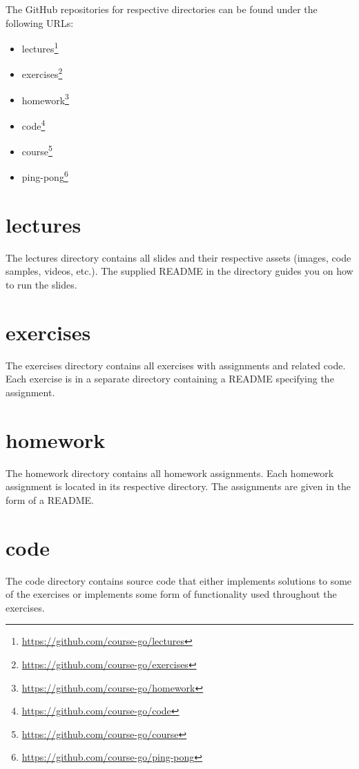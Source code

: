 \documentclass[
  digital,
  color,
  oneside,
  nosansbold,
  nocolorbold,
  lof,
  nolot,
]{fithesis4}
\begin{document}
The GitHub repositories for respective directories can be found under the following URLs:
\begin{itemize}
    \item lectures\footnote{\url{https://github.com/course-go/lectures}}
    \item exercises\footnote{\url{https://github.com/course-go/exercises}}
    \item homework\footnote{\url{https://github.com/course-go/homework}}
    \item code\footnote{\url{https://github.com/course-go/code}}
    \item course\footnote{\url{https://github.com/course-go/course}}
    \item ping-pong\footnote{\url{https://github.com/course-go/ping-pong}}
\end{itemize}

\section{lectures}

The lectures directory contains all slides and their respective assets (images, code samples, videos, etc.). The supplied README in the directory guides you on how to run the slides.

\section{exercises}

The exercises directory contains all exercises with assignments and related code. Each exercise is in a separate directory containing a README specifying the assignment.

\section{homework}

The homework directory contains all homework assignments. Each homework assignment is located in its respective directory. The assignments are given in the form of a README.

\section{code}

The code directory contains source code that either implements solutions to some of the exercises or implements some form of functionality used throughout the exercises.
\end{document}
